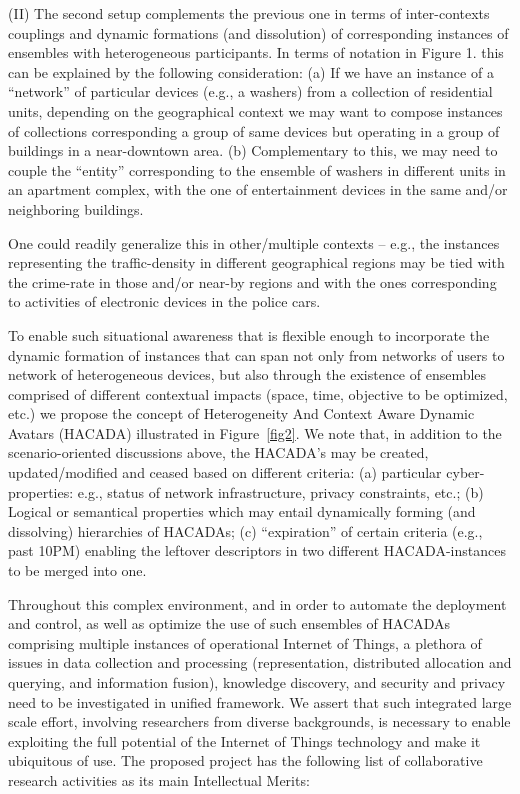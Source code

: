 (II) The second setup complements the previous one in terms of inter-contexts couplings and dynamic formations (and dissolution) of corresponding instances of ensembles with heterogeneous participants. In terms of notation in Figure 1. this can be explained by the following consideration:
(a) If we have an instance of a ``network'' of particular devices (e.g., a washers) from a collection of residential units, depending on the geographical context we may want to compose instances of collections corresponding a group of same devices but operating in a group of buildings in a near-downtown area.
(b) Complementary to this, we may need to couple the ``entity'' corresponding to the ensemble of washers in different units in an apartment complex, with the one of entertainment devices in the same and/or neighboring buildings.


One could readily generalize this in other/multiple contexts -- e.g., the instances representing the traffic-density in different geographical regions may be tied with the crime-rate in those and/or near-by regions and with the ones corresponding to activities of electronic devices in the police cars. %



To enable such situational awareness that is flexible enough to incorporate the dynamic formation of instances that can span not only from networks of users to network of heterogeneous devices, but also through the existence of ensembles comprised of different contextual impacts (space, time, objective to be optimized, etc.) we  propose the concept of Heterogeneity And Context Aware Dynamic Avatars (HACADA) illustrated in Figure~\ref{fig2}. We note that, in addition to the scenario-oriented discussions above, the HACADA's may be created, updated/modified and ceased based on different criteria: (a) particular cyber-properties: e.g., status of network infrastructure, privacy constraints, etc.; (b) Logical or semantical properties which may entail dynamically forming (and dissolving) hierarchies of HACADAs; (c) ``expiration'' of certain criteria (e.g., past 10PM) enabling the leftover descriptors in two different HACADA-instances to be merged into one.



Throughout this complex environment, and in order to automate the deployment and control, as well as optimize the use of such ensembles of HACADAs comprising multiple instances of operational Internet of Things,
a plethora of issues in data collection and processing (representation, distributed allocation and querying, and information fusion), knowledge discovery, and security and privacy need to be investigated in unified framework. We assert that  such integrated large scale effort, involving researchers from diverse backgrounds, is necessary to  enable exploiting the full potential of the Internet of Things technology  and make it ubiquitous of use. The proposed project has the following list of collaborative research activities as its main Intellectual Merits:

